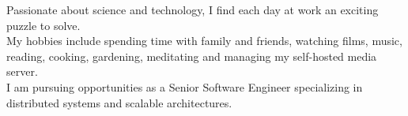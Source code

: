%
%
%

\vspace{-0.8em}
\vspace{0.5em}
Passionate about science and technology, I find each day at work an exciting puzzle to solve.\\
My hobbies include spending time with family and friends, watching films, music, reading, cooking, gardening, meditating and managing my self-hosted media server.\\
I am pursuing opportunities as a Senior Software Engineer specializing in distributed systems and scalable architectures.
